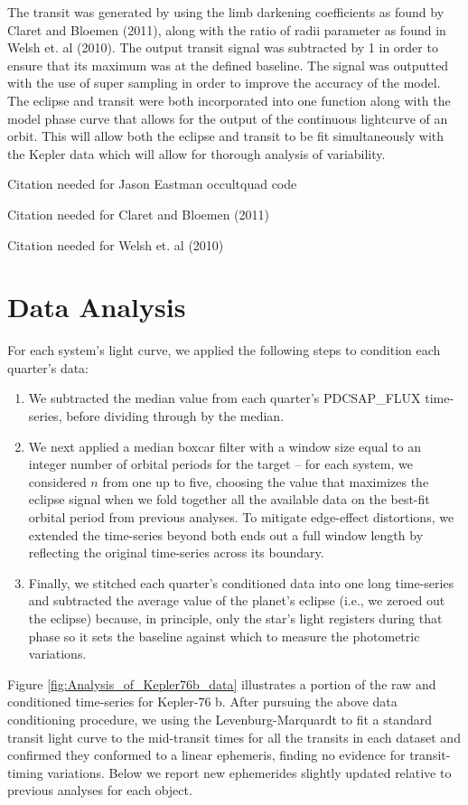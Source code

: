 \documentclass[manuscript]{aastex}
\begin{document}
    The transit was generated by using the limb darkening coefficients as found by Claret and Bloemen (2011), along with the ratio of radii parameter as found in Welsh et. al (2010). The output transit signal was subtracted by 1 in order to ensure that its maximum was at the defined baseline. The signal was outputted with the use of super sampling in order to improve the accuracy of the model. 
    The eclipse and transit were both incorporated into one function along with the model phase curve that allows for the output of the continuous lightcurve of an orbit. This will allow both the eclipse and transit to be fit simultaneously with the Kepler data which will allow for thorough analysis of variability. 


Citation needed for Jason Eastman occultquad code

Citation needed for Claret and Bloemen (2011)

Citation needed for  Welsh et. al (2010)


\section{Data Analysis}
For each system's light curve, we applied the following steps to condition each quarter's data:
\begin{enumerate}
\item We subtracted the median value from each quarter's PDCSAP\_FLUX time-series, before dividing through by the median.
\item We next applied a median boxcar filter with a window size equal to an integer number of orbital periods for the target -- for each system, we considered $n$ from one up to five, choosing the value that maximizes the eclipse signal when we fold together all the available data on the best-fit orbital period from previous analyses. To mitigate edge-effect distortions, we extended the time-series beyond both ends out a full window length by reflecting the original time-series across its boundary.
\item Finally, we stitched each quarter's conditioned data into one long time-series and subtracted the average value of the planet's eclipse (i.e., we zeroed out the eclipse) because, in principle, only the star's light registers during that phase so it sets the baseline against which to measure the photometric variations.
\end{enumerate}
Figure \ref{fig:Analysis_of_Kepler76b_data} illustrates a portion of the raw and conditioned time-series for Kepler-76 b. After pursuing the above data conditioning procedure, we using the Levenburg-Marquardt to fit a standard transit light curve \citep{2002ApJ...580L.171M} to the mid-transit times for all the transits in each dataset and confirmed they conformed to a linear ephemeris, finding no evidence for transit-timing variations. Below we report new ephemerides slightly updated relative to previous analyses for each object.
\end{document}
